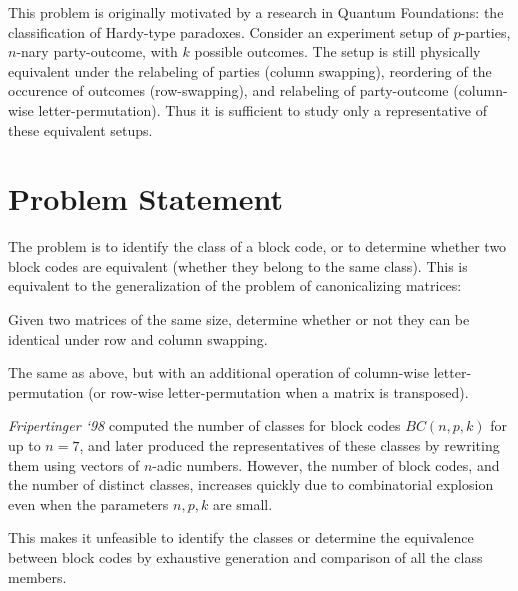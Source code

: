 \documentclass[12pt]{article}  %
\begin{document}
 This problem is originally motivated by a research in Quantum Foundations: the classification of Hardy-type paradoxes. Consider an experiment setup of $p$-parties, $n$-nary party-outcome, with $k$ possible outcomes. The setup is still physically equivalent under the relabeling of parties (column swapping), reordering of the occurence of outcomes (row-swapping), and relabeling of party-outcome (column-wise letter-permutation). Thus it is sufficient to study only a representative of these equivalent setups.
















\section{Problem Statement}

The problem is to identify the class of a block code, or to determine whether two block codes are equivalent (whether they belong to the same class). This is equivalent to the generalization of the problem of canonicalizing matrices:

 Given two matrices of the same size, determine whether or not they can be identical under row and column swapping.

 The same as above, but with an additional operation of column-wise letter-permutation (or row-wise letter-permutation when a matrix is transposed).


\textit{Fripertinger `98} computed the number of classes for block codes $BC(n,p,k)$ for up to $n=7$, and later produced the representatives of these classes by rewriting them using vectors of $n$-adic numbers. However, the number of block codes, and the number of distinct classes, increases quickly due to combinatorial explosion even when the parameters $n,p,k$ are small. 

This makes it unfeasible to identify the classes or determine the equivalence between block codes by exhaustive generation and comparison of all the class members.
\end{document}
